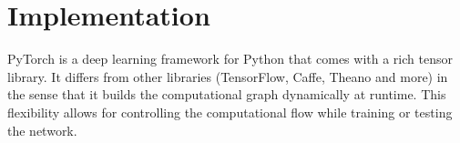 			
			
	\section{Implementation}
		PyTorch is a deep learning framework for Python that comes with a rich tensor library.
		It differs from other libraries (TensorFlow, Caffe, Theano and more) in the sense that it builds the computational graph dynamically at runtime.
		This flexibility allows for controlling the computational flow while training or testing the network.

